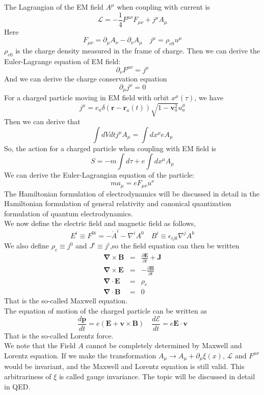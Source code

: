 \documentclass[cyan]{elegantnote}
\begin{document}
The Lagrangian of the EM field $A^{\mu}$ when coupling with current is
\[\mathcal{L} = -\frac{1}{4}F^{\mu\nu}F_{\mu\nu} + j^{\mu} A_{\mu}\]
Here
\[F_{\mu\nu} = \partial_{\mu}A_{\nu} - \partial_{\nu}A_{\mu} \quad j^{\mu} = \rho_{e0} u^{\mu}\]
$\rho_{e0}$ is the charge density measured in the frame of charge.
Then we can derive the Euler-Lagrange equation of EM field:
\[\partial_{\nu} F^{\mu\nu} = j^{\mu}\]
And we can derive the charge conservation equation
\[\partial_{\mu} j^{\mu} = 0\]
For a charged particle moving in EM field with orbit $x^{\mu}(\tau)$, we have
\[j^{\mu} =  e_a \delta(\bm{r}-\bm{r}_a(t)) \sqrt{1-\bm{v}_a^2} u_a^\mu \]
Then we can derive that
\[\int dV dt j^{\mu} A_{\mu} = \int dx^{\mu} e A_{\mu}\]
So, the action for a charged particle when coupling with EM field is
\[S = - m \int d\tau + e\int dx^{\mu} A_{\mu}\]
We can derive the Euler-Lagrangian equation of the particle:
\[ma_{\mu} = eF_{\mu \nu}u^{\nu}\]
The Hamiltonian formulation of electrodynamics will be discussed in detail in the Hamiltonian formulation of general relativity and canonical quantization formulation of quantum electrodynamics.\\
We now define the electric field and magnetic field as follows,
\[E^i \equiv F^{0i} = -\dot{A}^i - \nabla^i A^0 \quad B^i \equiv \epsilon_{ijk} \nabla^j A^k\]
We also define $\rho_e \equiv j^0$ and $J^i \equiv j^i$,so
the field equation can then be written
\begin{eqnarray}
	\bm{\nabla} \times  \bm{B} &=& \frac{\partial \bm{E}}{\partial t} +  \bm{J} \nonumber \\
	\bm{\nabla} \times \bm{E} &=& -\frac{\partial \bm{B}}{\partial t} \nonumber \\
	\bm{\nabla} \cdot \bm{E} &=& \rho_e \nonumber \\
	\bm{\nabla} \cdot \bm{B} &=& 0 \nonumber
\end{eqnarray}
That is the so-called Maxwell equation.\\
The equation of motion of the charged particle can be written as
\[\frac{d\bm{p}}{dt} = e(\bm{E} + \bm{v} \times \bm{B}) \quad \frac{d \mathcal{E}}{dt} = e \bm{E} \cdot \bm{v}\]
That is the so-called Lorentz force.\\
We note that the Field $A$ cannot be completely determined by Maxwell and Lorentz equation. If we make the transformation $A_{\mu} \to A_{\mu} + \partial_{\mu} \xi(x)$, $\mathcal{L}$ and $F^{\mu\nu}$ would be invariant, and the Maxwell and Lorentz equation is still valid. This arbitrariness of $\xi$ is called gauge invariance. The topic will be discussed in detail in QED.
\end{document}
